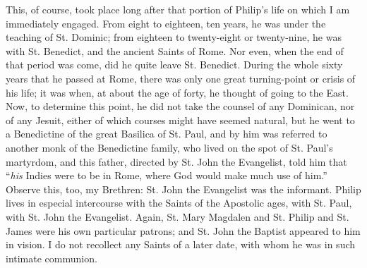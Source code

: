 This, of course, took place long after that portion of
Philip's life on which I am immediately engaged. From
eight to eighteen, ten years, he was under the teaching
of St. Dominic; from eighteen to twenty-eight or
twenty-nine, he was with St. Benedict, and the ancient
Saints of Rome. Nor even, when the end of that period was
come, did he quite leave St. Benedict. During the whole
sixty years that he passed at Rome, there was only one
great turning-point or crisis of his life; it was when,
at about the age of forty, he thought of going to the
East. Now, to determine this point, he did not take the
counsel of any Dominican, nor of any Jesuit, either of
which courses might have seemed natural, but he went to a
Benedictine of the great Basilica of St. Paul, and by him
was referred to another monk of the Benedictine family,
who lived on the spot of St. Paul's martyrdom, and this
father, directed by St. John the Evangelist, told him that
``\emph{his} Indies were to be in Rome, where God
would make much use of him.'' Observe this, too, my
Brethren: St. John the Evangelist was the informant.
Philip lives in especial intercourse with the Saints of
the Apostolic ages, with St. Paul, with St. John the
Evangelist. Again, St. Mary Magdalen and St. Philip and
St. James were his own particular patrons; and St. John
the Baptist appeared to him in vision. I do not recollect
any Saints of a later date, with whom he was in such
intimate communion.

